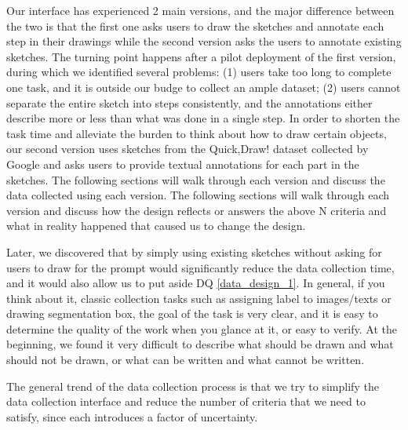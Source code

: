 
Our interface has experienced 2 main versions, and the major difference between the two is that the first one asks users to draw the sketches and annotate each step in their drawings while the second version asks the users to annotate existing sketches. The turning point happens after a pilot deployment of the first version, during which we identified several problems: (1) users take too long to complete one task, and it is outside our budge to collect an ample dataset; (2) users cannot separate the entire sketch into steps consistently, and the annotations either describe more or less than what was done in a single step. In order to shorten the task time and alleviate the burden to think about how to draw certain objects, our second version uses sketches from the Quick,Draw! dataset collected by Google and asks users to provide textual annotations for each part in the sketches. The following sections will walk through each version and discuss the data collected using each version. The following sections will walk through each version and discuss how the design reflects or answers the above N criteria and what in reality happened that caused us to change the design.  

Later, we discovered that by simply using existing sketches without asking for users to draw for the prompt would significantly reduce the data collection time, and it would also allow us to put aside DQ \ref{data_design_1}. In general, if you think about it, classic collection tasks such as assigning label to images/texts or drawing segmentation box, the goal of the task is very clear, and it is easy to determine the quality of the work when you glance at it, or easy to verify. At the beginning, we found it very difficult to describe what should be drawn and what should not be drawn, or what can be written and what cannot be written. 

The general trend of the data collection process is that we try to simplify the data collection interface and reduce the number of criteria that we need to satisfy, since each introduces a factor of uncertainty. 

